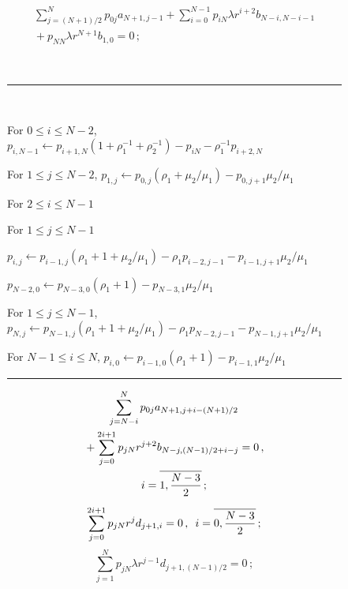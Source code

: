 \begin{multicols}{2}
\vspace*{-12pt}

\noindent
\begin{multline}
\label{n3}
\sum\limits_{j=(N+1)/2}^N
p_{0j} a_{N+1,j-1} +
\sum\limits_{i=0}^{N-1} p_{iN} \lambda r^{i+2} b_{N-i,N-i-1}\\
{}+
p_{NN}\lambda r^{N+1}b_{1,0}=0\,;
\end{multline}

\begin{figure*}

\

\hrule

\

\noindent
For $0 \le i \le N-2$, $p_{i,N-1} \leftarrow 
p_{i+1,N}\left(1+\rho_1^{-1}+\rho_2^{-1}\right)-p_{iN}-
\rho_1^{-1} p_{i+2,N}$

\noindent 
For $1 \le j \le N-2$, $p_{1,j} \leftarrow 
p_{0,j}\left( \rho_1+{\mu_2/\mu_1}\right)-p_{0,j+1}{\mu_2/\mu_1}$

\noindent 
For $2 \le i \le N-1$
   
   \hspace*{3mm}For $1 \le j \le N-1$

\hspace*{4mm}$p_{i,j} \leftarrow p_{i-1,j}\left(\rho_1+1+{\mu_2/\mu_1}\right)-\rho_1 p_{i-2,j-1}-p_{i-1,j+1}{\mu_2/\mu_1}$

\noindent 
$p_{N-2,0} \leftarrow p_{N-3,0}\left( \rho_1 +1\right)-p_{N-3,1}{\mu_2/\mu_1}$

\noindent
For $1 \le j \le N-1$,
$p_{N,j} \leftarrow p_{N-1,j}\left( \rho_1 +1+{\mu_2/\mu_1}\right)- \rho_1 p_{N-2,j-1}-p_{N-1,j+1}{\mu_2/\mu_1}$

\noindent For $N-1 \le i \le N$, $p_{i,0} \leftarrow p_{i-1,0}\left( \rho_1 +1\right)-p_{i-1,1}{\mu_2/\mu_1}$

\vspace*{3pt}

\hrule
\end{figure*}

\vspace*{-12pt}

\noindent
\begin{multline}
\label{n4}
\sum\limits_{j=N-i}^N
p_{0j} a_{N+1,j+i-(N+1)/2}  \\
{}+ \sum\limits_{j=0}^{2i+1}
p_{jN}  r^{j+2} b_{N-j,(N-1)/2+i-j}=0\,,\\
 i=\overline{1,\displaystyle\frac{\displaystyle N-3\mathstrut}{\displaystyle 2\mathstrut}}\,;
\end{multline}
\begin{equation}
\label{n5}
\sum\limits_{j=0}^{2i+1}p_{jN}  r^{j} d_{j+1,i}=0\,,\enskip 
i=\overline{0,\displaystyle\frac{\displaystyle N-3\mathstrut}{\displaystyle 2\mathstrut}}\,;
\end{equation}
\begin{equation}
\label{n6}
\sum\limits_{j=1}^{N} p_{jN} \lambda r^{j-1} d_{j+1,(N-1)/2}=0\,;
\end{equation}


\end{multicols}
